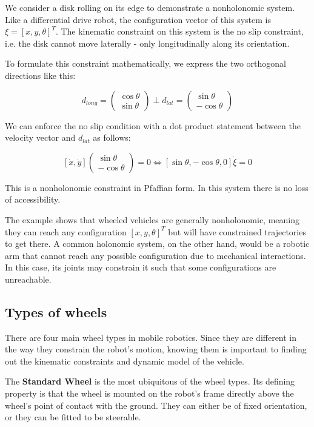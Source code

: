 \documentclass[twoside]{article}
\begin{document}
We consider a disk rolling on its edge to demonstrate a nonholonomic system. Like a differential drive robot, the configuration vector of this system is $ \xi = [x, y, \theta]^T $. The kinematic constraint on this system is the no slip constraint, i.e. the disk cannot move laterally - only longitudinally along its orientation.

To formulate this constraint mathematically, we express the two orthogonal directions like this:

\[ d_{long} =
\begin{pmatrix} \cos \theta \\ \sin \theta \end{pmatrix} 
\perp
d_{lat} =
\begin{pmatrix} \sin \theta \\ -\cos \theta \end{pmatrix}
\]

We can enforce the no slip condition with a dot product statement between the velocity vector and $ d_{lat} $ as follows:

$$
[\dot{x},  \dot{y}] \begin{pmatrix} \sin \theta \\ -\cos \theta \end{pmatrix} = 0 \iff 
[\sin \theta, -\cos \theta, 0] \dot{\xi} = 0
$$

This is a nonholonomic constraint in Pfaffian form. In this system there is no loss of accessibility. 

The example shows that wheeled vehicles are generally nonholonomic, meaning they can reach any configuration $[x,y,\theta]^T$ but will have constrained trajectories to get there. A common holonomic system, on the other hand, would be a robotic arm that cannot reach any possible configuration due to mechanical interactions. In this case, its joints may constrain it such that some configurations are unreachable. 

\subsection*{Types of wheels}

There are four main wheel types in mobile robotics. Since they are different in the way they constrain the robot's motion, knowing them is important to finding out the kinematic constraints and dynamic model of the vehicle.

The \textbf{Standard Wheel} is the most ubiquitous of the wheel types. Its defining property is that the wheel is mounted on the robot's frame directly above the wheel's point of contact with the ground. They can either be of fixed orientation, or they can be fitted to be steerable\cite{sns}. 
\end{document}
